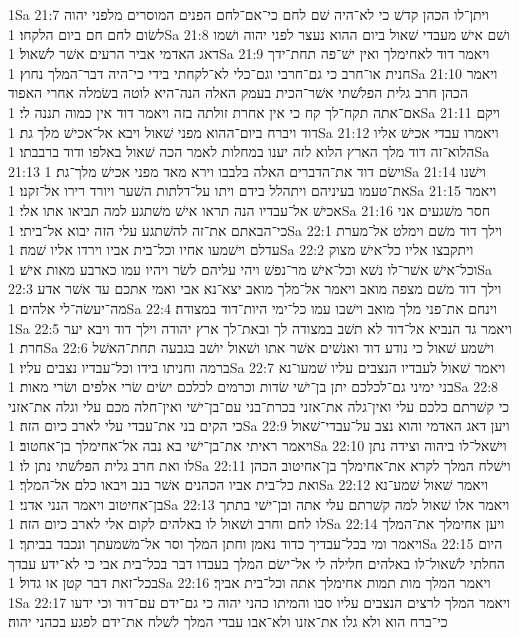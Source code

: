 1Sa 21:7  ויתן־לו הכהן קדשׁ כי לא־היה שׁם לחם כי־אם־לחם הפנים המוסרים מלפני יהוה לשׂום לחם חם ביום הלקחו׃
1Sa 21:8  ושׁם אישׁ מעבדי שׁאול ביום ההוא נעצר לפני יהוה ושׁמו דאג האדמי אביר הרעים אשׁר לשׁאול׃
1Sa 21:9  ויאמר דוד לאחימלך ואין ישׁ־פה תחת־ידך חנית או־חרב כי גם־חרבי וגם־כלי לא־לקחתי בידי כי־היה דבר־המלך נחוץ׃
1Sa 21:10  ויאמר הכהן חרב גלית הפלשׁתי אשׁר־הכית בעמק האלה הנה־היא לוטה בשׂמלה אחרי האפוד אם־אתה תקח־לך קח כי אין אחרת זולתה בזה ויאמר דוד אין כמוה תננה לי׃
1Sa 21:11  ויקם דוד ויברח ביום־ההוא מפני שׁאול ויבא אל־אכישׁ מלך גת׃
1Sa 21:12  ויאמרו עבדי אכישׁ אליו הלוא־זה דוד מלך הארץ הלוא לזה יענו במחלות לאמר הכה שׁאול באלפו ודוד ברבבתו׃
1Sa 21:13  וישׂם דוד את־הדברים האלה בלבבו וירא מאד מפני אכישׁ מלך־גת׃
1Sa 21:14  וישׁנו את־טעמו בעיניהם ויתהלל בידם ויתו על־דלתות השׁער ויורד רירו אל־זקנו׃
1Sa 21:15  ויאמר אכישׁ אל־עבדיו הנה תראו אישׁ משׁתגע למה תביאו אתו אלי׃
1Sa 21:16  חסר משׁגעים אני כי־הבאתם את־זה להשׁתגע עלי הזה יבוא אל־ביתי׃
1Sa 22:1  וילך דוד משׁם וימלט אל־מערת עדלם וישׁמעו אחיו וכל־בית אביו וירדו אליו שׁמה׃
1Sa 22:2  ויתקבצו אליו כל־אישׁ מצוק וכל־אישׁ אשׁר־לו נשׁא וכל־אישׁ מר־נפשׁ ויהי עליהם לשׂר ויהיו עמו כארבע מאות אישׁ׃
1Sa 22:3  וילך דוד משׁם מצפה מואב ויאמר אל־מלך מואב יצא־נא אבי ואמי אתכם עד אשׁר אדע מה־יעשׂה־לי אלהים׃
1Sa 22:4  וינחם את־פני מלך מואב וישׁבו עמו כל־ימי היות־דוד במצודה׃
1Sa 22:5  ויאמר גד הנביא אל־דוד לא תשׁב במצודה לך ובאת־לך ארץ יהודה וילך דוד ויבא יער חרת׃
1Sa 22:6  וישׁמע שׁאול כי נודע דוד ואנשׁים אשׁר אתו ושׁאול יושׁב בגבעה תחת־האשׁל ברמה וחניתו בידו וכל־עבדיו נצבים עליו׃
1Sa 22:7  ויאמר שׁאול לעבדיו הנצבים עליו שׁמעו־נא בני ימיני גם־לכלכם יתן בן־ישׁי שׂדות וכרמים לכלכם ישׂים שׂרי אלפים ושׂרי מאות׃
1Sa 22:8  כי קשׁרתם כלכם עלי ואין־גלה את־אזני בכרת־בני עם־בן־ישׁי ואין־חלה מכם עלי וגלה את־אזני כי הקים בני את־עבדי עלי לארב כיום הזה׃
1Sa 22:9  ויען דאג האדמי והוא נצב על־עבדי־שׁאול ויאמר ראיתי את־בן־ישׁי בא נבה אל־אחימלך בן־אחטוב׃
1Sa 22:10  וישׁאל־לו ביהוה וצידה נתן לו ואת חרב גלית הפלשׁתי נתן לו׃
1Sa 22:11  וישׁלח המלך לקרא את־אחימלך בן־אחיטוב הכהן ואת כל־בית אביו הכהנים אשׁר בנב ויבאו כלם אל־המלך׃
1Sa 22:12  ויאמר שׁאול שׁמע־נא בן־אחיטוב ויאמר הנני אדני׃
1Sa 22:13  ויאמר אלו שׁאול למה קשׁרתם עלי אתה ובן־ישׁי בתתך לו לחם וחרב ושׁאול לו באלהים לקום אלי לארב כיום הזה׃
1Sa 22:14  ויען אחימלך את־המלך ויאמר ומי בכל־עבדיך כדוד נאמן וחתן המלך וסר אל־משׁמעתך ונכבד בביתך׃
1Sa 22:15  היום החלתי לשׁאול־לו באלהים חלילה לי אל־ישׂם המלך בעבדו דבר בכל־בית אבי כי לא־ידע עבדך בכל־זאת דבר קטן או גדול׃
1Sa 22:16  ויאמר המלך מות תמות אחימלך אתה וכל־בית אביך׃
1Sa 22:17  ויאמר המלך לרצים הנצבים עליו סבו והמיתו כהני יהוה כי גם־ידם עם־דוד וכי ידעו כי־ברח הוא ולא גלו את־אזנו ולא־אבו עבדי המלך לשׁלח את־ידם לפגע בכהני יהוה׃
